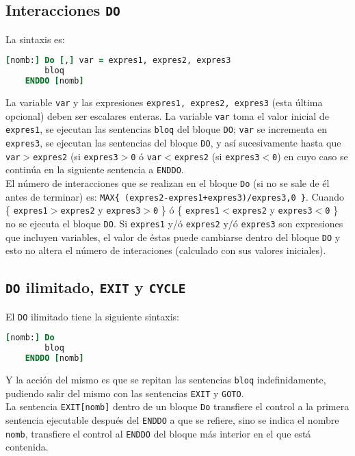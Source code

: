 \subsection{Interacciones {\tt DO}}

La sintaxis es:

\begin{lstlisting}[language=Fortran]
	[nomb:] Do [,] var = expres1, expres2, expres3 
		bloq
	ENDDO [nomb]
\end{lstlisting}

La variable {\tt var} y las expresiones {\tt expres1, expres2, expres3} (esta última opcional) deben ser escalares enteras. La variable {\tt var} toma el valor inicial de {\tt expres1}, se ejecutan las sentencias {\tt bloq} del bloque {\tt DO}; {\tt var} se incrementa en {\tt expres3}, se ejecutan las sentencias del bloque {\tt DO}, y así sucesivamente hasta que {\tt var$>$expres2} (si {\tt expres3$>$0} ó  {\tt var$<$expres2} (si {\tt expres3$<$0}) en cuyo caso se continúa en la siguiente sentencia a {\tt ENDDO}. \\

El número de interacciones que se realizan en el bloque {\tt Do} (si no se sale de él antes de terminar) es: {\tt MAX\{ (expres2-expres1+expres3)/expres3,0 \}}. Cuando \{ {\tt expres1$>$expres2} y {\tt expres3$>$0} \}  ó \{ {\tt expres1$<$expres2} y {\tt expres3$<$0} \}  no se ejecuta el bloque {\tt DO}. Si {\tt expres1} y/ó {\tt expres2} y/ó {\tt expres3} son expresiones que incluyen variables, el valor de éstas puede cambiarse dentro del bloque  {\tt DO} y esto no altera el número de interaciones (calculado con sus valores iniciales). 

\subsection{{\tt DO} ilimitado, {\tt EXIT} y {\tt CYCLE}}

El {\tt DO} ilimitado tiene la siguiente sintaxis:

\begin{lstlisting}[language=Fortran]
	[nomb:] Do 
		bloq
	ENDDO [nomb]
\end{lstlisting}
Y la acción del mismo es que se repitan las sentencias {\tt bloq} indefinidamente, pudiendo salir del mismo con las sentencias {\tt EXIT} y {\tt GOTO}. \\


La sentencia {\tt EXIT[nomb]} dentro de un bloque {\tt Do} transfiere el control a la primera sentencia ejecutable después del {\tt ENDDO} a que se refiere, sino se indica el nombre {\tt nomb}, transfiere el control al {\tt ENDDO} del bloque más interior en el que está contenida. \\ 


